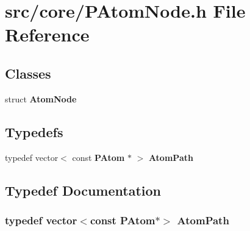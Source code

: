 \section{src/core/PAtom\-Node.h File Reference}
\label{PAtomNode_8h}


\subsection*{Classes}
\begin{CompactItemize}
\item 
struct {\bf Atom\-Node}
\end{CompactItemize}
\subsection*{Typedefs}
\begin{CompactItemize}
\item 
typedef vector$<$ const {\bf PAtom} $\ast$ $>$ {\bf Atom\-Path}
\end{CompactItemize}


\subsection{Typedef Documentation}
\subsubsection{\setlength{\rightskip}{0pt plus 5cm}typedef vector$<$const {\bf PAtom}$\ast$$>$ {\bf Atom\-Path}}\label{PAtomNode_8h_7913fc51d6074993e167ad3c55ec5db8}



